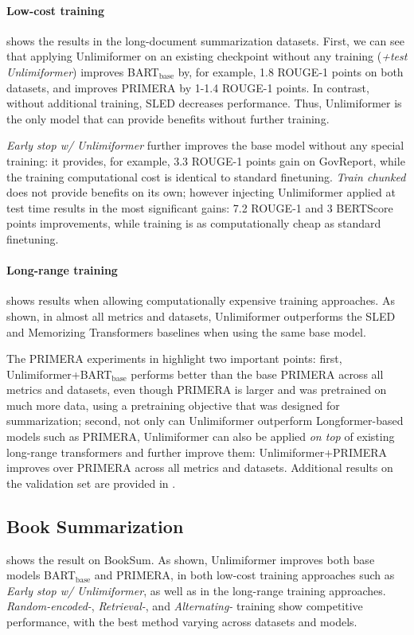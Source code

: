 \documentclass{article}
\newcommand{\ours}{Unlimiformer\xspace}
\begin{document}
\paragraph{Low-cost training}
 shows the results in the long-document %
summarization datasets. First, we can see that applying \ours on an existing checkpoint without any training (\textit{+test \ours}) improves BART$_{\text{base}}$ by, for example, 1.8 ROUGE-1 points on both datasets, and improves PRIMERA by 1-1.4 ROUGE-1 points.
In contrast, without additional training, SLED decreases performance.
Thus, \ours is the only model that can provide benefits without further training. 

\textit{Early stop w/ \ours} further improves the base model without any special training: it provides, for example, 3.3 ROUGE-1 points gain on GovReport, while the training computational cost is identical to standard finetuning. 
\emph{Train chunked} does not provide benefits on its own; however injecting \ours applied at test time results in the most significant gains: 7.2 ROUGE-1 and 3 BERTScore points improvements, while training is as computationally cheap as standard finetuning.

\paragraph{Long-range training}
 shows results when allowing computationally expensive training approaches.
As shown, in almost all metrics and datasets, \ours outperforms the SLED and Memorizing Transformers baselines when using  the same base model. 

The PRIMERA experiments in  highlight two important points: first, Unlimiformer+BART$_{\text{base}}$ performs better than the base PRIMERA across all metrics and datasets, even though PRIMERA is larger and was pretrained on much more data, using a pretraining objective that was designed for summarization; 
second, 
not only can \ours outperform Longformer-based models such as PRIMERA, \ours can also be applied \emph{on top} of existing long-range transformers and further improve them: Unlimiformer+PRIMERA improves over PRIMERA across all metrics and datasets.
Additional results on the validation set are provided in .

\subsection{Book Summarization}
 shows the result on BookSum. As shown, \ours improves both base models BART$_{\text{base}}$ and PRIMERA, in both low-cost training approaches such as \textit{Early stop w/ \ours}, as well as in the long-range training approaches.
 \textit{Random-encoded-},  \textit{Retrieval-}, and \textit{Alternating-} training show competitive performance, with the best method varying across datasets and models.
\end{document}
